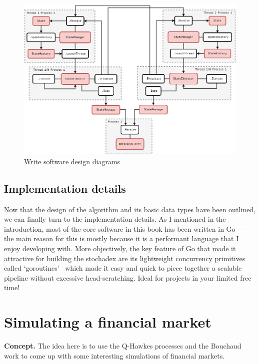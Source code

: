 \documentclass{book}
\begin{document}
\begin{figure}[h]
\centering
\includegraphics[width=15cm]{images/stochadex-loop.drawio.png}
\caption{Write software design diagrams}
\label{fig:loop-design}
\end{figure}


\section{\sffamily Implementation details}

Now that the design of the algorithm and its basic data types have been outlined, we can finally turn to the implementation details. As I mentioned in the introduction, most of the core software in this book has been written in Go --- the main reason for this is mostly because it is a performant language that I enjoy developing with. More objectively, the key feature of Go that made it attractive for building the stochadex are its lightweight concurrency primitives called `goroutines'~\cite{goroutines} which made it easy and quick to piece together a scalable pipeline without excessive head-scratching. Ideal for projects in your limited free time!



\chapter{\sffamily Simulating a financial market}

{\bfseries\sffamily Concept.} The idea here is to use the Q-Hawkes processes and the Bouchaud work to come up with some interesting simulations of financial markets. 
\end{document}
